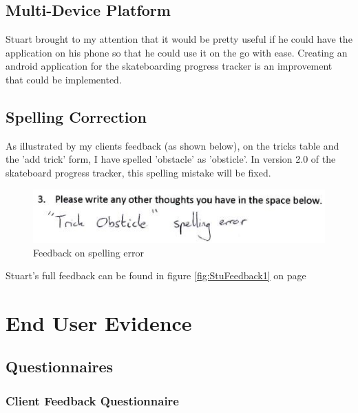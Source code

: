 	\subsection{Multi-Device Platform}

Stuart brought to my attention that it would be pretty useful if he could have the application on his phone so that he could use it on the go with ease. Creating an android application for the skateboarding progress tracker is an improvement that could be implemented.

	\subsection{Spelling Correction}

As illustrated by my clients feedback (as shown below), on the tricks table and the 'add trick' form, I have spelled 'obstacle' as 'obsticle'. In version 2.0 of the skateboard progress tracker, this spelling mistake will be fixed.

\begin{figure}[H]
    \includegraphics[width=\textwidth]{./Evaluation/images/StuSpellingError.jpg}
    \caption{Feedback on spelling error} \label{fig:StuSpellingError}
\end{figure}

Stuart's full feedback can be found in figure \ref{fig:StuFeedback1} on page \pageref{fig:StuFeedback1}





\section{End User Evidence}

\subsection{Questionnaires} \label{QSub}

\subsubsection{Client Feedback Questionnaire} 



